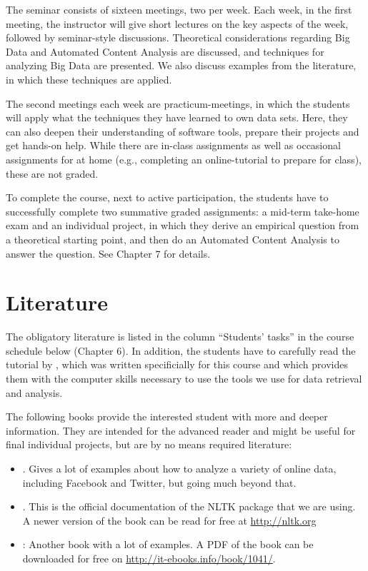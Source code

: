 \documentclass[a4paper,12pt]{report}
\begin{document}
The seminar consists of sixteen meetings, two per week. Each week, in the first meeting, the instructor will give short lectures on the key aspects of the week, followed by seminar-style discussions. Theoretical considerations regarding Big Data and Automated Content Analysis are discussed, and techniques for analyzing Big Data are presented. We also discuss examples from the literature, in which these techniques are applied.


The second meetings each week are practicum-meetings, in which the students will apply what the techniques they have learned to own data sets. Here, they can also deepen their understanding of software tools, prepare their projects and get hands-on help. While there are in-class assignments as well as occasional assignments for at home (e.g., completing an online-tutorial to prepare for class), these are not graded.


To complete the course, next to active participation, the students have to successfully complete two summative graded assignments: a mid-term take-home exam and an individual project, in which they derive an empirical question from a theoretical starting point, and then do an Automated Content Analysis to answer the question. See Chapter 7 for details.


\chapter{Literature}

The obligatory literature is listed in the column “Students’ tasks” in the course schedule below (Chapter 6). In addition, the students have to carefully read the tutorial by  \cite{Trilling2016}, which was written specificially for this course and which provides them with the computer skills necessary to use the tools we use for data retrieval and analysis.


The following books provide the interested student with more and deeper information. They are intended for the advanced reader and might be useful for final individual projects, but are by no means required literature:

\begin{itemize}
\item \citealp{Russel2013}. Gives a lot of examples about how to analyze a variety of online data, including Facebook and Twitter, but going much beyond that.
\item \citealp{Bird2009}. This is the official documentation of the NLTK package that we are using. A newer version of the book can be read for free at \url{http://nltk.org}
\item \citealp{McKinney2012}: Another book with a lot of examples. A PDF of the book can be downloaded for free on \url{http://it-ebooks.info/book/1041/}.
\end{itemize}
\end{document}
